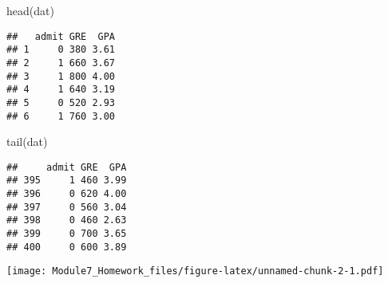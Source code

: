 \documentclass[
]{article}
\newenvironment{Shaded}{\begin{snugshade}}{\end{snugshade}}
\newcommand{\AttributeTok}[1]{\textcolor[rgb]{0.77,0.63,0.00}{#1}}
\newcommand{\DecValTok}[1]{\textcolor[rgb]{0.00,0.00,0.81}{#1}}
\newcommand{\FunctionTok}[1]{\textcolor[rgb]{0.00,0.00,0.00}{#1}}
\newcommand{\NormalTok}[1]{#1}
\newcommand{\OtherTok}[1]{\textcolor[rgb]{0.56,0.35,0.01}{#1}}
\newcommand{\SpecialCharTok}[1]{\textcolor[rgb]{0.00,0.00,0.00}{#1}}
\newcommand{\StringTok}[1]{\textcolor[rgb]{0.31,0.60,0.02}{#1}}
\begin{document}
\begin{Shaded}
\begin{Highlighting}[]
\FunctionTok{head}\NormalTok{(dat)}
\end{Highlighting}
\end{Shaded}

\begin{verbatim}
##   admit GRE  GPA
## 1     0 380 3.61
## 2     1 660 3.67
## 3     1 800 4.00
## 4     1 640 3.19
## 5     0 520 2.93
## 6     1 760 3.00
\end{verbatim}

\begin{Shaded}
\begin{Highlighting}[]
\FunctionTok{tail}\NormalTok{(dat)}
\end{Highlighting}
\end{Shaded}

\begin{verbatim}
##     admit GRE  GPA
## 395     1 460 3.99
## 396     0 620 4.00
## 397     0 560 3.04
## 398     0 460 2.63
## 399     0 700 3.65
## 400     0 600 3.89
\end{verbatim}

\begin{Shaded}
\end{Shaded}

\texttt{[image: Module7\_Homework\_files/figure-latex/unnamed-chunk-2-1.pdf]}

\begin{Shaded}
\end{Shaded}
\end{document}
